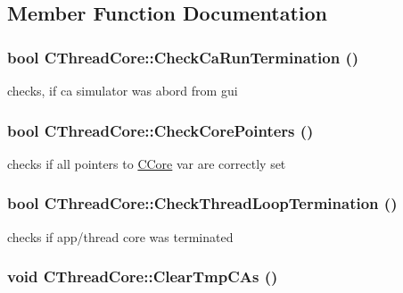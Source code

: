 \subsection{Member Function Documentation}
\hypertarget{classCThreadCore_ac19af4cab9673daf796044312634c97a}{
\subsubsection[{CheckCaRunTermination}]{\setlength{\rightskip}{0pt plus 5cm}bool CThreadCore::CheckCaRunTermination ()}}
\label{classCThreadCore_ac19af4cab9673daf796044312634c97a}
checks, if ca simulator was abord from gui \hypertarget{classCThreadCore_a27d1fd877a64e906a250898a36aeb730}{
\subsubsection[{CheckCorePointers}]{\setlength{\rightskip}{0pt plus 5cm}bool CThreadCore::CheckCorePointers ()}}
\label{classCThreadCore_a27d1fd877a64e906a250898a36aeb730}
checks if all pointers to \hyperlink{classCCore}{CCore} var are correctly set \hypertarget{classCThreadCore_a817d1a465e68edcb480a30d66ec7f5c2}{
\subsubsection[{CheckThreadLoopTermination}]{\setlength{\rightskip}{0pt plus 5cm}bool CThreadCore::CheckThreadLoopTermination ()}}
\label{classCThreadCore_a817d1a465e68edcb480a30d66ec7f5c2}
checks if app/thread core was terminated \hypertarget{classCThreadCore_a6a70230547c401faba79d362df341bae}{
\subsubsection[{ClearTmpCAs}]{\setlength{\rightskip}{0pt plus 5cm}void CThreadCore::ClearTmpCAs ()}}
